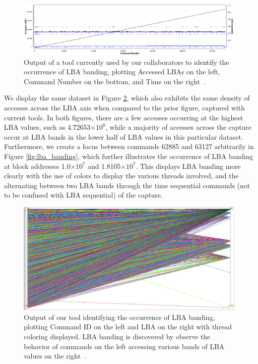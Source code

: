 \documentclass[journal]{vgtc}                %
\providecommand{\e}[1]{\ensuremath{\times 10^{#1}}}
\begin{document}
\begin{figure}[h!]
 \centering
 \includegraphics[width=\columnwidth]{images/prev_tool.eps}
 \caption[Output of a tool currently used to identify LBA banding.]{Output of a tool currently used by our collaborators to identify the occurrence of LBA banding, plotting Accessed LBAs on the left, Command Number on the bottom, and Time on the right~\cite{internal:collab}.}
 \label{fig:prev_tool}
\end{figure}

We display the same dataset in Figure \ref{fig:lba_banding_full}, which also exhibits the same density of accesses across the LBA axis when compared to the prior figure, captured with current tools. In both figures, there are a few accesses occurring at the highest LBA values, such as 4.72653\e{8}, while a majority of accesses across the capture occur at LBA bands in the lower half of LBA values in this particular dataset. Furthermore, we create a focus between commands 62885 and 63127 arbitrarily in Figure \ref{fig:lba_banding}, which further illustrates the occurrence of LBA banding at block addresses 1.0\e{7} and 1.8105\e{7}. This displays LBA banding more clearly with the use of colors to display the various threads involved, and the alternating between two LBA bands through the time sequential commands (not to be confused with LBA sequential) of the capture.

\begin{figure}[h!!]
 \centering
 \includegraphics[width=\columnwidth]{images/lba_banding_full.eps}
 \caption[Output of our tool identifying the occurrence of LBA banding.]{Output of our tool identifying the occurrence of LBA banding, plotting Command ID on the left and LBA on the right with thread coloring displayed. LBA banding is discovered by observe the behavior of commands on the left accessing various bands of LBA values on the right~\cite{internal:collab}.}
 \label{fig:lba_banding_full}
\end{figure}
\end{document}
